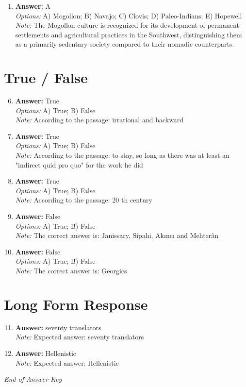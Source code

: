 \documentclass[12pt]{article}
\begin{document}
\begin{enumerate}[label=\arabic*.]
\\ \textit{Note:} Taphonomy is the branch of paleontology that examines the processes of decay, preservation, and the fossilization of organisms, thereby providing insights into the plant and animal life from specific historical periods.
\item \textbf{Answer:} A
\\ \textit{Options:} A) Mogollon; B) Navajo; C) Clovis; D) Paleo-Indians; E) Hopewell
\\ \textit{Note:} The Mogollon culture is recognized for its development of permanent settlements and agricultural practices in the Southwest, distinguishing them as a primarily sedentary society compared to their nomadic counterparts.
\end{enumerate}

\section*{True / False}
\begin{enumerate}[label=\arabic*.]
\setcounter{enumi}{5}
\item \textbf{Answer:} True
\\ \textit{Options:} A) True; B) False
\\ \textit{Note:} According to the passage: irrational and backward
\item \textbf{Answer:} True
\\ \textit{Options:} A) True; B) False
\\ \textit{Note:} According to the passage: to stay, so long as there was at least an "indirect quid pro quo" for the work he did
\item \textbf{Answer:} True
\\ \textit{Options:} A) True; B) False
\\ \textit{Note:} According to the passage: 20 th century
\item \textbf{Answer:} False
\\ \textit{Options:} A) True; B) False
\\ \textit{Note:} The correct answer is: Janissary, Sipahi, Akıncı and Mehterân
\item \textbf{Answer:} False
\\ \textit{Options:} A) True; B) False
\\ \textit{Note:} The correct answer is: Georgics
\end{enumerate}

\section*{Long Form Response}
\begin{enumerate}[label=\arabic*.]
\setcounter{enumi}{10}
\item \textbf{Answer:} seventy translators
\\ \textit{Note:} Expected answer: seventy translators
\item \textbf{Answer:} Hellenistic
\\ \textit{Note:} Expected answer: Hellenistic
\end{enumerate}

\vfill
\noindent\textit{End of Answer Key}
\end{document}
